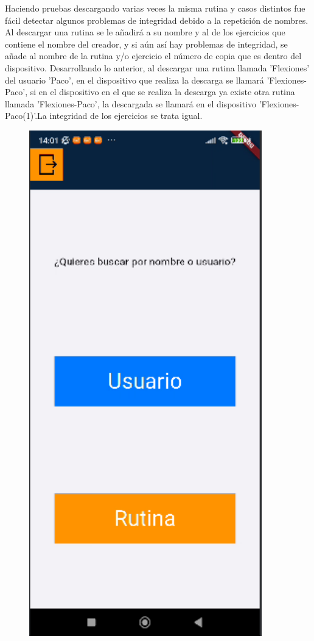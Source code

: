 Haciendo pruebas descargando varias veces la misma rutina y casos distintos fue fácil detectar algunos problemas de integridad debido a la repetición de nombres. Al descargar una rutina se le añadirá a su nombre y al de los ejercicios que contiene el nombre del creador, y si aún así hay problemas de integridad, se añade al nombre de la rutina y/o ejercicio el número de copia que es dentro del dispositivo. Desarrollando lo anterior, al descargar una rutina llamada 'Flexiones' del usuario 'Paco', en el dispositivo que realiza la descarga se llamará 'Flexiones-Paco', si en el dispositivo en el que se realiza la descarga ya existe otra rutina llamada 'Flexiones-Paco', la descargada se llamará en el dispositivo 'Flexiones-Paco(1)'.La integridad de los ejercicios se trata igual.

\begin{figure}[H]
   \centering
   \begin{minipage}{0.4\textwidth}
      \centering
      \includegraphics[width=0.9\textwidth]{pantallas/buscarRutinasNomOUser.png}

\end{minipage}
\end{figure}
